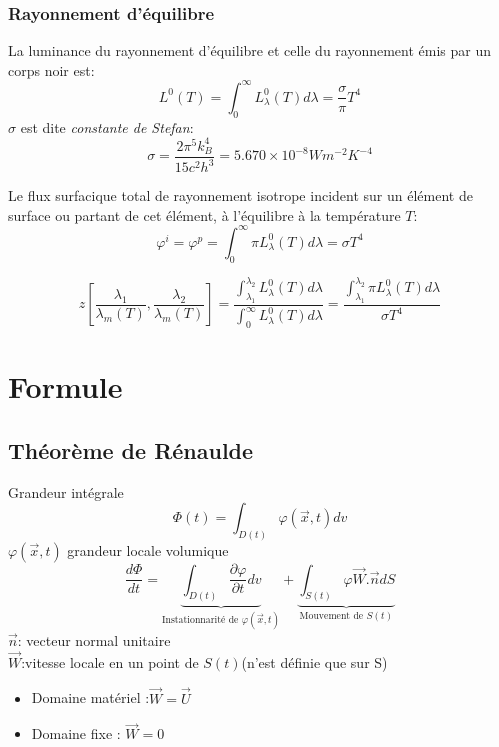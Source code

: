 \subsubsection{Rayonnement d'\'equilibre}
La luminance du rayonnement d'\'equilibre et celle du rayonnement \'emis par un corps noir est:
$$L^0(T)=\int_{0}^{\infty}L_{\lambda}^0(T)d \lambda =\frac{\sigma}{\pi}T^4$$
$\sigma$ est dite \textit{constante de Stefan}:
$$\sigma=\frac{ 2\pi^5 k_B^4}{15c^2 h^3}=5.670\times 10^{-8} Wm^{-2}K^{-4}$$

Le flux surfacique total de rayonnement isotrope incident sur un \'el\'ement de surface ou partant de cet \'el\'ement, \`a l'\'equilibre \`a la temp\'erature $T$:
$$\varphi^i=\varphi^p=\int_{0}^{\infty}\pi L_{\lambda}^0(T)d \lambda =\sigma T^4$$

$$
z[ \frac{ \lambda _1}{\lambda _m(T)}, \frac{ \lambda _2}{\lambda _m(T)}]
=
\frac{ \int_{\lambda _1}^{\lambda _2} L_{\lambda}^0(T)d \lambda }{\int_{0}^{\infty}L_{\lambda}^0(T)d \lambda }
=
\frac{ \int_{\lambda _1}^{\lambda _2}\pi L_{\lambda}^0(T)d \lambda }{\sigma T^4}
$$

\section{Formule}
\subsection{Th\'eor\`eme de R\'enaulde}
Grandeur int\'egrale
$$
\Phi(t)=\int_{D(t)} \varphi(\vec{x},t)dv
$$
$\varphi(\vec{x},t)$ grandeur locale volumique
$$
\frac{ d\Phi}{dt}=
\underbrace{\int_{D(t)}\frac{\partial \varphi}{\partial t}dv}_{\text{Instationnarit\'e de } \varphi(\vec{x},t)}
+
\underbrace{\int_{S(t)} \varphi \vec{W}.\vec{n}dS}_{\text{Mouvement de }S(t)}
$$
$\vec{n}$: vecteur normal unitaire\\
$\vec{W}$:vitesse locale en un point de $S(t)$(n'est définie que sur S)\\
\begin{itemize}
\item  Domaine mat\'eriel :$\vec{W}=\vec{ U}$
\item  Domaine fixe : $\vec{W}=0$
\end{itemize}

